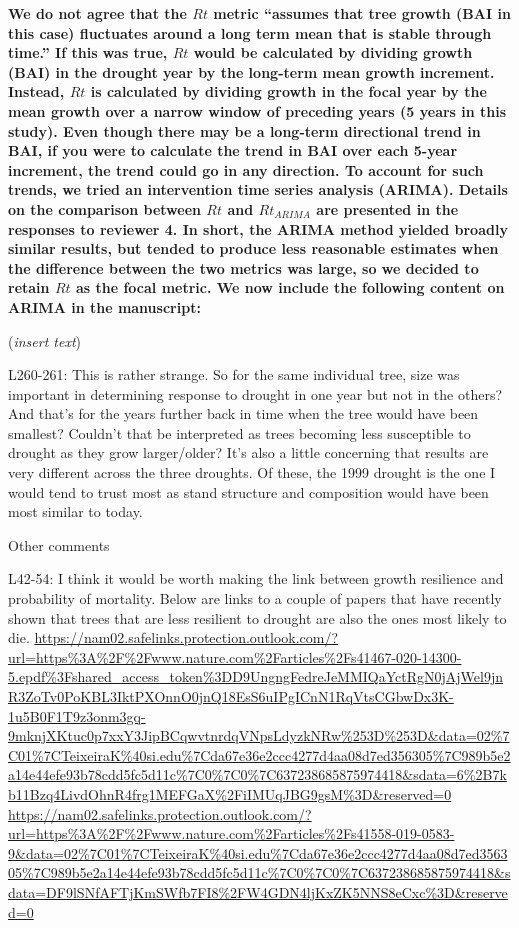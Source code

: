 \documentclass[
]{article}
\begin{document}
\textbf{We do not agree that the \(Rt\) metric ``assumes that tree
growth (BAI in this case) fluctuates around a long term mean that is
stable through time.'' If this was true, \(Rt\) would be calculated by
dividing growth (BAI) in the drought year by the long-term mean growth
increment. Instead, \(Rt\) is calculated by dividing growth in the focal
year by the mean growth over a narrow window of preceding years (5 years
in this study). Even though there may be a long-term directional trend
in BAI, if you were to calculate the trend in BAI over each 5-year
increment, the trend could go in any direction. To account for such
trends, we tried an intervention time series analysis (ARIMA). Details
on the comparison between \(Rt\) and \(Rt_{ARIMA}\) are presented in the
responses to reviewer 4. In short, the ARIMA method yielded broadly
similar results, but tended to produce less reasonable estimates when
the difference between the two metrics was large, so we decided to
retain \(Rt\) as the focal metric. We now include the following content
on ARIMA in the manuscript:}

(\emph{insert text})

L260-261: This is rather strange. So for the same individual tree, size
was important in determining response to drought in one year but not in
the others? And that's for the years further back in time when the tree
would have been smallest? Couldn't that be interpreted as trees becoming
less susceptible to drought as they grow larger/older? It's also a
little concerning that results are very different across the three
droughts. Of these, the 1999 drought is the one I would tend to trust
most as stand structure and composition would have been most similar to
today.

Other comments

L42-54: I think it would be worth making the link between growth
resilience and probability of mortality. Below are links to a couple of
papers that have recently shown that trees that are less resilient to
drought are also the ones most likely to die.
\url{https://nam02.safelinks.protection.outlook.com/?url=https\%3A\%2F\%2Fwww.nature.com\%2Farticles\%2Fs41467-020-14300-5.epdf\%3Fshared_access_token\%3DD9UngngFedreJeMMIQaYctRgN0jAjWel9jnR3ZoTv0PoKBL3IktPXOnnO0jnQ18EsS6uIPgICnN1RqVtsCGbwDx3K-1u5B0F1T9z3onm3gq-9mknjXKtuc0p7xxY3JipBCqwvtnrdqVNpsLdyzkNRw\%253D\%253D\&data=02\%7C01\%7CTeixeiraK\%40si.edu\%7Cda67e36e2ccc4277d4aa08d7ed356305\%7C989b5e2a14e44efe93b78cdd5fc5d11c\%7C0\%7C0\%7C637238685875974418\&sdata=6\%2B7kb11Bzq4LivdOhnR4frg1MEFGaX\%2FiIMUqJBG9gsM\%3D\&reserved=0}
\url{https://nam02.safelinks.protection.outlook.com/?url=https\%3A\%2F\%2Fwww.nature.com\%2Farticles\%2Fs41558-019-0583-9\&data=02\%7C01\%7CTeixeiraK\%40si.edu\%7Cda67e36e2ccc4277d4aa08d7ed356305\%7C989b5e2a14e44efe93b78cdd5fc5d11c\%7C0\%7C0\%7C637238685875974418\&sdata=DF9lSNfAFTjKmSWfb7FI8\%2FW4GDN4ljKxZK5NNS8eCxc\%3D\&reserved=0}
\end{document}
